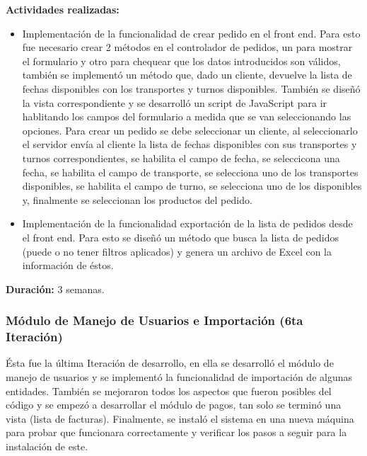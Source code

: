 \vspace{0.3cm}
\textbf{Actividades realizadas:}
\begin{itemize}
    \item Implementación de la funcionalidad de crear pedido en el front end. Para esto fue necesario crear 2 métodos en el controlador de pedidos, un para mostrar el formulario y otro para chequear que los datos introducidos son válidos, también se implementó un método que, dado un cliente, devuelve la lista de fechas disponibles con los transportes y turnos disponibles. También se diseñó la vista correspondiente y se desarrolló un script de JavaScript para ir hablitando los campos del formulario a medida que se van seleccionando las opciones. Para crear un pedido se debe seleccionar un cliente, al seleccionarlo el servidor envía al cliente la lista de fechas disponibles con sus transportes y turnos correspondientes, se habilita el campo de fecha, se seleccicona una fecha, se habilita el campo de transporte, se selecciona uno de los transportes disponibles, se habilita el campo de turno, se selecciona uno de los disponibles y, finalmente se seleccionan los productos del pedido.
    \item Implementación de la funcionalidad exportación de la lista de pedidos desde el front end. Para esto se diseñó un método que busca la lista de pedidos (puede o no tener filtros aplicados) y genera un archivo de Excel con la información de éstos.
\end{itemize}

\textbf{Duración:} 3 semanas.

\subsubsection{Módulo de Manejo de Usuarios e Importación (6ta Iteración)}
Ésta fue la última Iteración de desarrollo, en ella se desarrolló el módulo de manejo de usuarios y se implementó la funcionalidad de importación de algunas entidades. También se mejoraron todos los aspectos que fueron posibles del código y se empezó a desarrollar el módulo de pagos, tan solo se terminó una vista (lista de facturas). Finalmente, se instaló el sistema en una nueva máquina para probar que funcionara correctamente y verificar los pasos a seguir para la instalación de este.

